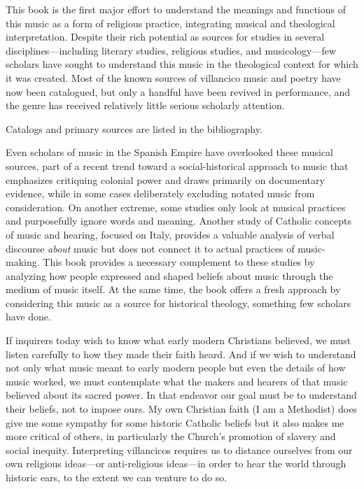 This book is the first major effort to understand the meanings and functions of
this music as a form of religious practice, integrating musical and theological
interpretation.
Despite their rich potential as sources for studies in several
disciplines---including literary studies, religious studies, and
musicology---few scholars have sought to understand this music in the
theological context for which it was created.
Most of the known sources of villancico music and poetry have now been
catalogued, but only a handful have been revived in performance, and the
genre has received relatively little serious scholarly attention.%
\begin{Footnote}
    Catalogs and primary sources are listed in the bibliography.
\end{Footnote}
Even scholars of music in the Spanish Empire have overlooked these musical
sources, part of a recent trend toward a social-historical approach to music
that emphasizes critiquing colonial power and draws primarily on documentary
evidence, while in some cases deliberately excluding notated music from
consideration.%
    \Autocites
    {Baker:Harmony}
    {RamosKittrell:PlayingCathedral}
On another extreme, some studies only look at musical practices and
purposefully ignore words and meaning.%
    \Autocites
    {Rubio:Forma}
    {Swadley:VillancicoPhD}
Another study of Catholic concepts of music and hearing, focused on Italy,
provides a valuable analysis of verbal discourse \emph{about} music but does
not connect it to actual practices of music-making.%
    \Autocite{DellAntonio:Listening}
This book provides a necessary complement to these studies by analyzing how
people expressed and shaped beliefs about music through the medium of music
itself.
At the same time, the book offers a fresh approach by considering this music as
a source for historical theology, something few scholars have done.

If inquirers today wish to know what early modern Christians believed, we
must listen carefully to how they made their faith heard.
And if we wish to understand not only what music meant to early
modern people but even the details of how music worked, we must contemplate
what the makers and hearers of that music believed about its sacred power. 
In that endeavor our goal must be to understand their beliefs, not to impose
ours.
My own Christian faith (I am a Methodist) does give me some sympathy for
some historic Catholic beliefs but it also makes me more critical of others, in
particularly the Church's promotion of slavery and social inequity.
Interpreting villancicos requires us to distance ourselves from our own
religious ideas---or anti-religious ideas---in order to hear the world through
historic ears, to the extent we can venture to do so.%
    \Autocites{Burstyn:PeriodEar}

